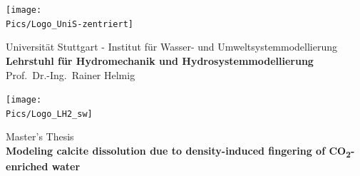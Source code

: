 \thispagestyle{empty} %

\vspace*{-2truecm}

\newlength{\HeadWidth}
\setlength{\HeadWidth}{\textwidth}

\newlength{\LogoWidthL}
\addtolength{\HeadWidth}{-\LogoWidthL}
\addtolength{\HeadWidth}{-3mm} %

\newlength{\LogoWidthR}
\addtolength{\HeadWidth}{-\LogoWidthR}
\addtolength{\HeadWidth}{-3mm} %

\newlength{\BoxBreite}
\setlength{\BoxBreite}{\textwidth}

\vspace*{-1.5cm}
{
  \parbox[b]{\BoxBreite}
  {                               
    \texttt{[image: \\Pics/Logo\_UniS-zentriert]}
    \parbox[b][22mm][c]{\HeadWidth}
    {                                       
      \fontsize{10}{11pt}\selectfont \sffamily        
      \begin{center}          
        Universit\"at Stuttgart  -  Institut f\"ur Wasser- und Umweltsystemmodellierung\\    
        {\bfseries 
          Lehrstuhl f\"ur Hydromechanik und Hydrosystemmodellierung}\\
        Prof.~Dr.-Ing.~Rainer Helmig    
      \end{center} 
      }
    \texttt{[image: \\Pics/Logo\_LH2\_sw]} \\ [-3mm] 
    }
  }       
\vspace{3cm}

\begin{center}
   {\large Master's Thesis}\\[0.5cm]
  {\bfseries {\LARGE Modeling calcite dissolution due to
density-induced fingering of CO\textsubscript{2}-enriched water\\[0.3cm]}}
\end{center}

